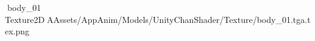    body_01            	   Texture2D   A   Assets/AppAnim/Models/UnityChanShader/Texture/body_01.tga.tex.png